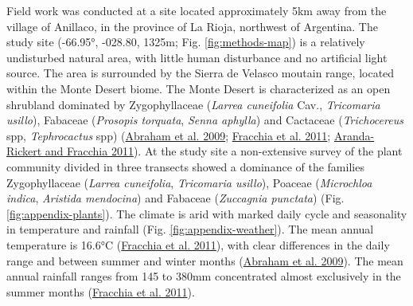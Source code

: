\documentclass[english,msc,numbers,hidelinks]{coppe}
\begin{document}
  Field work was conducted at a site located approximately 5km away from the village of Anillaco, in the province of La Rioja, northwest of Argentina. The study site (-66.95°, -028.80, 1325m; Fig. \ref{fig:methods-map}) is a relatively undisturbed natural area, with little human disturbance and no artificial light source. The area is surrounded by the Sierra de Velasco moutain range, located within the Monte Desert biome. The Monte Desert is characterized as an open shrubland dominated by Zygophyllaceae (\emph{Larrea cuneifolia} Cav., \emph{Tricomaria usillo}), Fabaceae (\emph{Prosopis torquata}, \emph{Senna aphylla}) and Cactaceae (\emph{Trichocereus} spp, \emph{Tephrocactus} spp) (\protect\hyperlink{ref-abraham2009}{Abraham et al. 2009}; \protect\hyperlink{ref-fracchia2011}{Fracchia et al. 2011}; \protect\hyperlink{ref-aranda-rickert2011a}{Aranda-Rickert and Fracchia 2011}). At the study site a non-extensive survey of the plant community divided in three transects showed a dominance of the families Zygophyllaceae (\emph{Larrea cuneifolia}, \emph{Tricomaria usillo}), Poaceae (\emph{Microchloa indica}, \emph{Aristida mendocina}) and Fabaceae (\emph{Zuccagnia punctata}) (Fig. \ref{fig:appendix-plants}). The climate is arid with marked daily cycle and seasonality in temperature and rainfall (Fig. \ref{fig:appendix-weather}). The mean annual temperature is 16.6°C (\protect\hyperlink{ref-fracchia2011}{Fracchia et al. 2011}), with clear differences in the daily range and between summer and winter months (\protect\hyperlink{ref-abraham2009}{Abraham et al. 2009}). The mean annual rainfall ranges from 145 to 380mm concentrated almost exclusively in the summer months (\protect\hyperlink{ref-fracchia2011}{Fracchia et al. 2011}).
\end{document}
